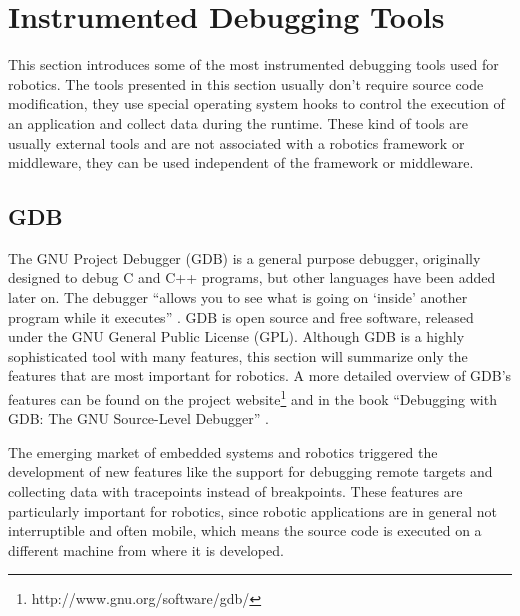 
\section{Instrumented Debugging Tools}
This section introduces some of the most instrumented  debugging tools used for robotics. The tools presented in this section usually don't require source code modification, they use special operating system hooks to control the execution of an application and collect data during the runtime. These kind of tools are usually external tools and are not associated with a robotics framework or middleware, they can be used independent of the framework or middleware.

\subsection{GDB}
The GNU Project Debugger (GDB) is a general purpose debugger, originally designed to debug C and C++ programs, but other languages have been added later on. The debugger ``allows you to see what is going on `inside' another program while it executes'' \cite{Stallman2002}. GDB is open source and free software, released under the GNU General Public License (GPL). Although GDB is a highly sophisticated tool with many features, this section will summarize only the features that are most important for robotics. A more detailed overview of GDB's features can be found on the project website\footnote{http://www.gnu.org/software/gdb/} and in the book ``Debugging with GDB: The GNU Source-Level Debugger'' \cite{Stallman2002}.

The emerging market of embedded systems and robotics triggered the development of new features like the support for debugging remote targets and collecting data with tracepoints instead of breakpoints. These features are particularly important for robotics, since robotic applications are in general not interruptible and often mobile, which means the source code is executed on a different machine from where it is developed.

